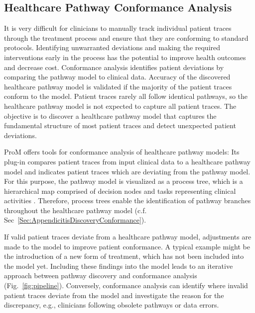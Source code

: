 
\subsection{Healthcare Pathway Conformance Analysis}
It is very difficult for clinicians to manually track individual patient traces through the treatment process and ensure that they are conforming to standard protocols. Identifying unwarranted deviations and making the required interventions early in the process has the potential to improve health outcomes and decrease cost. 
Conformance analysis identifies patient deviations by comparing the pathway model to clinical data. 
Accuracy of the discovered healthcare pathway model is validated if the majority of the patient traces conform to the model. Patient traces rarely all follow identical pathways, so the healthcare pathway model is not expected to capture all patient traces. The objective is to discover a healthcare pathway model that captures the fundamental structure of most patient traces and detect unexpected patient deviations. 

ProM offers tools for conformance analysis of healthcare
pathway models: Its plug-in  compares
patient traces from input clinical data to a healthcare pathway model
and indicates patient traces which are deviating from the pathway
model.
For this purpose, the pathway model is visualized as a process tree,
which is a hierarchical map comprised of decision nodes and
tasks representing clinical activities
\cite{25a7fd818bf44606a903d9b78b95cdd3}.
Therefore, process trees enable the identification of pathway branches
throughout the healthcare pathway model (c.f. Sec~\ref{Sec:AppendicitisDiscoveryConformance}).

If valid patient traces deviate from a healthcare pathway model, 
adjustments are made to the model to improve patient conformance.
A typical example might be the introduction of a new form of
treatment, which has not been included into the model yet.
Including these findings into the model leads to an iterative approach
between pathway discovery and conformance analysis (Fig.~\ref{fig:pipeline}).
Conversely, conformance analysis can identify where invalid
patient traces deviate from the model and investigate the reason for
the discrepancy, e.g., clinicians following obsolete pathways or data errors.

